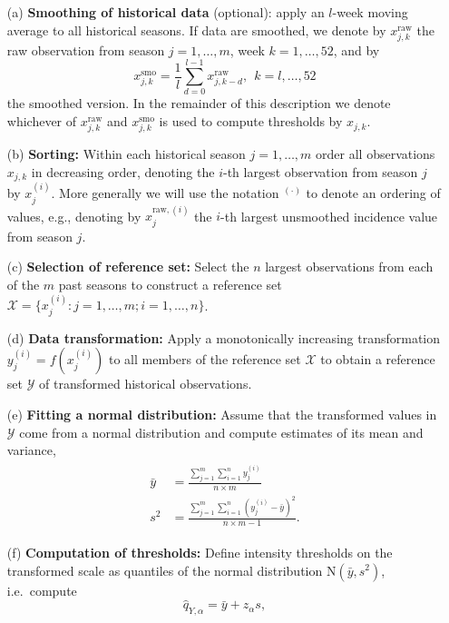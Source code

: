 \documentclass[12pt]{article}
\newcommand{\sd}{s}
\begin{document}
\begin{enumerate}
\item[(a)] \textbf{Smoothing of historical data} (optional): apply an $l$-week moving average to all historical seasons. If data are smoothed, we denote by $x^\text{raw}_{j, k}$ the raw observation from season $j = 1, \dots, m$, week $k = 1, \dots, 52$, and by
$$
x^\text{smo}_{j, k} = \frac{1}{l} \sum_{d = 0}^{l - 1} x^\text{raw}_{j, k - d}, \ \ k = l, \dots, 52
$$ the smoothed version. In the remainder of this description we denote whichever of $x^\text{raw}_{j, k}$ and $x^\text{smo}_{j, k}$ is used to compute thresholds by $x_{j, k}$.
\item[(b)] \textbf{Sorting:} Within each historical season $j = 1, \dots, m$ order all observations $x_{j, k}$ in decreasing order, denoting the $i$-th largest observation from season $j$ by $x^{(i)}_j$. More generally we will use the notation $^{(\cdot)}$ to denote an ordering of values, e.g., denoting by $x^{\text{raw}, (i)}_j$ the $i$-th largest unsmoothed incidence value from season $j$.
\item[(c)] \textbf{Selection of reference set:} Select the $n$ largest observations from each of the $m$ past seasons to construct a reference set $\mathcal{X} = \{x_j^{(i)}: j = 1, \dots, m; i = 1, \dots, n\}$.
\item[(d)] \textbf{Data transformation:} Apply a monotonically increasing transformation $y_j^{(i)} = f(x_j^{(i)})$ to all members of the reference set $\mathcal{X}$ to obtain a reference set $\mathcal{Y}$ of transformed historical observations.
\item[(e)] \textbf{Fitting a normal distribution:} Assume that the transformed values in $\mathcal{Y}$ come from a normal distribution and compute estimates of its mean and variance,
\begin{align}
\begin{split}
\bar{y} & = \frac{\sum_{j = 1}^m\sum_{i = 1}^n y_j^{(i)}}{n\times m}\\
\sd^2 & = \frac{\sum_{j = 1}^m\sum_{i = 1}^n \left(y_j^{(i)}  - \bar{y}\right)^2}{n\times m - 1}.
\end{split}\label{eq:moments}
\end{align}
\item[(f)] \textbf{Computation of thresholds:} Define intensity thresholds on the transformed scale as quantiles of the normal distribution N$(\bar{y}, \sd^2)$, i.e.\ compute
\begin{equation}
\hat{q}_{Y, \alpha} = \bar{y} + z_\alpha \sd, \label{eq:def_q}

\end{equation}
\end{enumerate}
\end{document}
